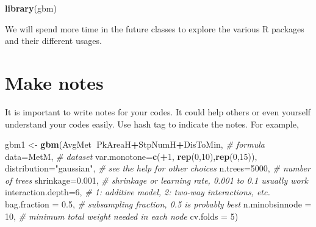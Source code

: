 \documentclass[]{book}
\newenvironment{Shaded}{\begin{snugshade}}{\end{snugshade}}
\newcommand{\CommentTok}[1]{\textcolor[rgb]{0.56,0.35,0.01}{\textit{#1}}}
\newcommand{\DataTypeTok}[1]{\textcolor[rgb]{0.13,0.29,0.53}{#1}}
\newcommand{\DecValTok}[1]{\textcolor[rgb]{0.00,0.00,0.81}{#1}}
\newcommand{\FloatTok}[1]{\textcolor[rgb]{0.00,0.00,0.81}{#1}}
\newcommand{\KeywordTok}[1]{\textcolor[rgb]{0.13,0.29,0.53}{\textbf{#1}}}
\newcommand{\NormalTok}[1]{#1}
\newcommand{\OperatorTok}[1]{\textcolor[rgb]{0.81,0.36,0.00}{\textbf{#1}}}
\newcommand{\StringTok}[1]{\textcolor[rgb]{0.31,0.60,0.02}{#1}}
\begin{document}
\begin{Shaded}
\begin{Highlighting}[]
\KeywordTok{library}\NormalTok{(gbm)}
\end{Highlighting}
\end{Shaded}

We will spend more time in the future classes to explore the various R packages and their different usages.

\hypertarget{make-notes}{%
\section{Make notes}\label{make-notes}}

It is important to write notes for your codes. It could help others or even yourself understand your codes easily. Use hash tag to indicate the notes. For example,

\begin{Shaded}
\begin{Highlighting}[]
\NormalTok{gbm1 <-}\StringTok{ }\KeywordTok{gbm}\NormalTok{(AvgMet}\OperatorTok{~}\NormalTok{PkAreaH}\OperatorTok{+}\NormalTok{StpNumH}\OperatorTok{+}\NormalTok{DisToMin,  }\CommentTok{# formula}
            \DataTypeTok{data=}\NormalTok{MetM,                        }\CommentTok{# dataset  }
            \DataTypeTok{var.monotone=}\KeywordTok{c}\NormalTok{(}\OperatorTok{+}\DecValTok{1}\NormalTok{, }\KeywordTok{rep}\NormalTok{(}\DecValTok{0}\NormalTok{,}\DecValTok{10}\NormalTok{),}\KeywordTok{rep}\NormalTok{(}\DecValTok{0}\NormalTok{,}\DecValTok{15}\NormalTok{)), }
            \DataTypeTok{distribution=}\StringTok{"gaussian"}\NormalTok{,          }\CommentTok{# see the help for other choices  }
            \DataTypeTok{n.trees=}\DecValTok{5000}\NormalTok{,                     }\CommentTok{# number of trees  }
            \DataTypeTok{shrinkage=}\FloatTok{0.001}\NormalTok{,                  }\CommentTok{# shrinkage or learning rate, 0.001 to 0.1 usually work  }
            \DataTypeTok{interaction.depth=}\DecValTok{6}\NormalTok{,              }\CommentTok{# 1: additive model, 2: two-way interactions, etc.  }
            \DataTypeTok{bag.fraction =} \FloatTok{0.5}\NormalTok{,               }\CommentTok{# subsampling fraction, 0.5 is probably best  }
            \DataTypeTok{n.minobsinnode =} \DecValTok{10}\NormalTok{,              }\CommentTok{# minimum total weight needed in each node}
            \DataTypeTok{cv.folds =} \DecValTok{5}\NormalTok{)}
\end{Highlighting}
\end{Shaded}
\end{document}

